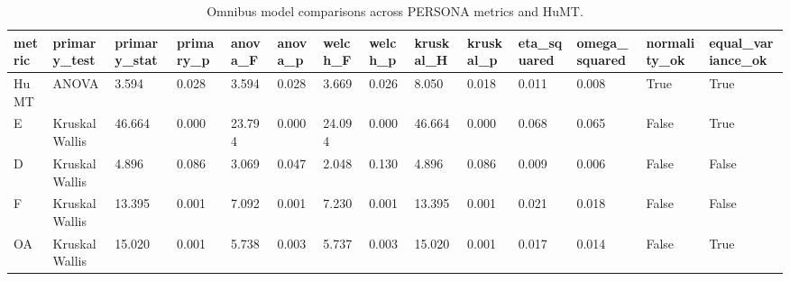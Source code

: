 \begin{table}[t]
\centering
\caption{Omnibus model comparisons across PERSONA metrics and HuMT.}
\label{tab:model_omnibus}
\begin{tabular}{llllllllllllll}
\toprule
metric & primary\_test & primary\_stat & primary\_p & anova\_F & anova\_p & welch\_F & welch\_p & kruskal\_H & kruskal\_p & eta\_squared & omega\_squared & normality\_ok & equal\_variance\_ok \\
\midrule
HuMT & ANOVA & 3.594 & 0.028 & 3.594 & 0.028 & 3.669 & 0.026 & 8.050 & 0.018 & 0.011 & 0.008 & True & True \\
E & KruskalWallis & 46.664 & 0.000 & 23.794 & 0.000 & 24.094 & 0.000 & 46.664 & 0.000 & 0.068 & 0.065 & False & True \\
D & KruskalWallis & 4.896 & 0.086 & 3.069 & 0.047 & 2.048 & 0.130 & 4.896 & 0.086 & 0.009 & 0.006 & False & False \\
F & KruskalWallis & 13.395 & 0.001 & 7.092 & 0.001 & 7.230 & 0.001 & 13.395 & 0.001 & 0.021 & 0.018 & False & False \\
OA & KruskalWallis & 15.020 & 0.001 & 5.738 & 0.003 & 5.737 & 0.003 & 15.020 & 0.001 & 0.017 & 0.014 & False & True \\
\bottomrule
\end{tabular}
\end{table}
